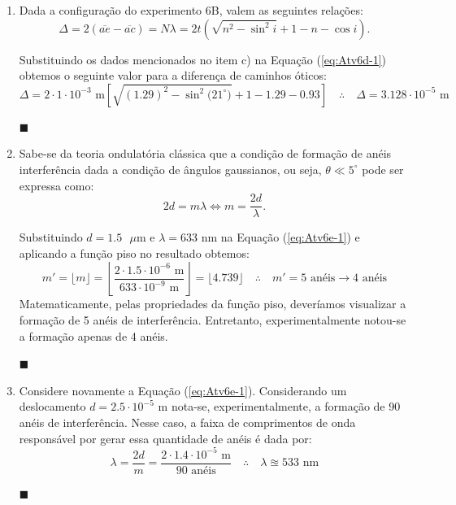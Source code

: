 \documentclass[12pt,a4paper]{article}
\begin{document}
\begin{enumerate}[label = \alph*)]
    \item Dada a configuração do experimento 6B, valem as seguintes relações:
    \begin{equation}\label{eq:Atv6d-1}
        \Delta=2(\overline{ae}-\overline{ac})=N\lambda=2t\left(\sqrt{n^2-\sin^2{i}}+1-n-\cos{i}\right).
    \end{equation}

    Substituindo os dados mencionados no item c) na Equação (\ref{eq:Atv6d-1}) obtemos o seguinte valor para a diferença de caminhos óticos:
    \begin{equation}\label{eq:Atv6d-2}
        \Delta=2\cdot1\cdot10^{-3}\text{ m}\left[\sqrt{(1.29)^2-\sin^2{(21^{\circ}})}+1-1.29-0.93\right]\quad\therefore\quad\boxed{\Delta=3.128\cdot10^{-5}\text{ m}}
    \end{equation}
    \begin{flushright}
        $\blacksquare$
    \end{flushright}



    \item Sabe-se da teoria ondulatória clássica que a condição de formação de anéis interferência dada a condição de ângulos gaussianos, ou seja, $\theta\ll5^{\circ}$ pode ser expressa como:
    \begin{equation}\label{eq:Atv6e-1}
        2d=m\lambda\iff m=\frac{2d}{\lambda}.
    \end{equation}

    Substituindo $d=1.5\text{ }\mu\text{m}$ e $\lambda=633\text{ nm}$ na Equação (\ref{eq:Atv6e-1}) e aplicando a função piso no resultado obtemos:
    \begin{equation}\label{eq:Atv6e-2}
        m'=\lfloor m \rfloor=\left\lfloor \frac{2\cdot1.5\cdot10^{-6}\text{ m}}{633\cdot10^{-9}\text{ m}}\right\rfloor=\lfloor 4.739\rfloor\quad\therefore\quad\boxed{m'=5\text{ anéis}\rightarrow4\text{ anéis}}
    \end{equation}
    Matematicamente, pelas propriedades da função piso, deveríamos visualizar a formação de 5 anéis de interferência. Entretanto, experimentalmente notou-se a formação apenas de 4 anéis.
    \begin{flushright}
        $\blacksquare$
    \end{flushright}
    



    \item Considere novamente a Equação (\ref{eq:Atv6e-1}). Considerando um deslocamento $d=2.5\cdot10^{-5}\text{ m}$ nota-se, experimentalmente, a formação de 90 anéis de interferência. Nesse caso, a faixa de comprimentos de onda responsável por gerar essa quantidade de anéis é dada por:
    \begin{equation}\label{eq:Atv6f-1}
        \lambda=\frac{2d}{m}=\frac{2\cdot1.4\cdot10^{-5}\text{ m}}{90\text{ anéis}}\quad\therefore\quad\boxed{\lambda\approxeq533\text{ nm}}
    \end{equation}
    \begin{flushright}
        $\blacksquare$
    \end{flushright}




\end{enumerate}
\end{document}
